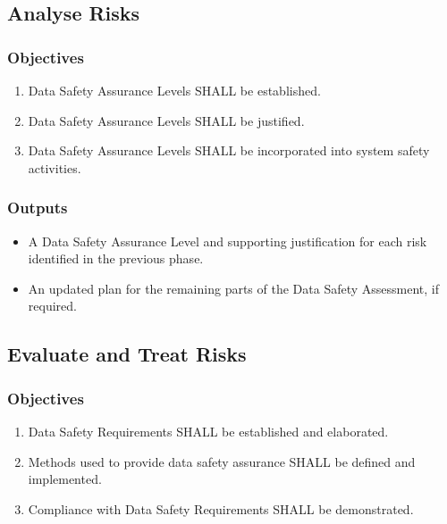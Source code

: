 \subsection{Analyse Risks}
\subsubsection{Objectives}
\begin{enumerate}[label=\color{dsiwgAccentColour}{3-\arabic*}]
	\item Data Safety Assurance Levels SHALL be established.
	\item Data Safety Assurance Levels SHALL be justified.
	\item Data Safety Assurance Levels SHALL be incorporated into system safety activities.
\end{enumerate}

\subsubsection{Outputs}
\begin{itemize}
	\item A Data Safety Assurance Level and supporting justification for each risk identified in the previous phase.
	\item An updated plan for the remaining parts of the Data Safety Assessment, if required.
\end{itemize}

\subsection{Evaluate and Treat Risks}
\subsubsection{Objectives}
\begin{enumerate}[label=\color{dsiwgAccentColour}{4-\arabic*}]
	\item {}Data Safety Requirements SHALL be established and elaborated.
	\item Methods used to provide data safety assurance SHALL be defined and implemented.
	\item Compliance with Data Safety Requirements SHALL be demonstrated.	
\end{enumerate}

